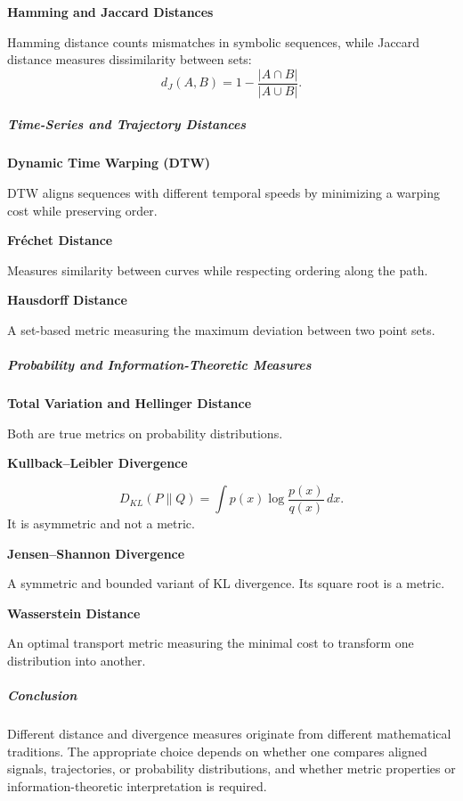 \documentclass{book}
\providecommand{\ProjectDeepHeading}[2]{%
    \par\medskip\noindent\textbf{#2}\par\smallskip
}
\begin{document}
\begin{minipage}{\textwidth}
            \ProjectDeepHeading{1}{Hamming and Jaccard Distances}
                Hamming distance counts mismatches in symbolic sequences, while Jaccard distance measures dissimilarity between sets:
                \[
                    d_J(A,B) = 1 - \frac{|A \cap B|}{|A \cup B|}.
                \]
        
        
        \subparagraph*{Time-Series and Trajectory Distances}
            
            \ProjectDeepHeading{1}{Dynamic Time Warping (DTW)}
                DTW aligns sequences with different temporal speeds by minimizing a warping cost while preserving order.
            
            \ProjectDeepHeading{1}{Fr\'echet Distance}
                Measures similarity between curves while respecting ordering along the path.
            
            \ProjectDeepHeading{1}{Hausdorff Distance}
                A set-based metric measuring the maximum deviation between two point sets.
        
        
        \subparagraph*{Probability and Information-Theoretic Measures}
            
            \ProjectDeepHeading{1}{Total Variation and Hellinger Distance}
                Both are true metrics on probability distributions.
            
            \ProjectDeepHeading{1}{Kullback--Leibler Divergence}
                \[
                    D_{KL}(P\|Q) = \int p(x)\log\frac{p(x)}{q(x)}\,dx.
                \]
                It is asymmetric and not a metric.
            
            \ProjectDeepHeading{1}{Jensen--Shannon Divergence}
                A symmetric and bounded variant of KL divergence. Its square root is a metric.
            
            \ProjectDeepHeading{1}{Wasserstein Distance}
                An optimal transport metric measuring the minimal cost to transform one distribution into another.
        
        
        \subparagraph*{Conclusion}
            Different distance and divergence measures originate from different mathematical traditions. The appropriate choice depends on whether one compares aligned signals, trajectories, or probability distributions, and whether metric properties or information-theoretic interpretation is required.
    
    \end{minipage}
\end{document}
